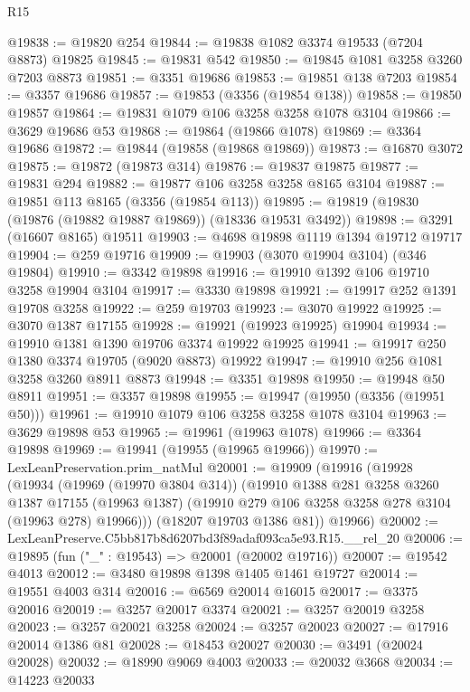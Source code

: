 \begin{lexlean}{R15}
\begin{coremodule}
@19838 := @19820 @254
@19844 := @19838 @1082 @3374 @19533 (@7204 @8873) @19825
@19845 := @19831 @542
@19850 := @19845 @1081 @3258 @3260 @7203 @8873
@19851 := @3351 @19686
@19853 := @19851 @138 @7203
@19854 := @3357 @19686
@19857 := @19853 (@3356 (@19854 @138))
@19858 := @19850 @19857
@19864 := @19831 @1079 @106 @3258 @3258 @1078 @3104
@19866 := @3629 @19686 @53
@19868 := @19864 (@19866 @1078)
@19869 := @3364 @19686
@19872 := @19844 (@19858 (@19868 @19869))
@19873 := @16870 @3072
@19875 := @19872 (@19873 @314)
@19876 := @19837 @19875
@19877 := @19831 @294
@19882 := @19877 @106 @3258 @3258 @8165 @3104
@19887 := @19851 @113 @8165 (@3356 (@19854 @113))
@19895 := @19819 (@19830 (@19876 (@19882 @19887 @19869)) (@18336 @19531 @3492))
@19898 := @3291 (@16607 @8165) @19511
@19903 := @4698 @19898 @1119 @1394 @19712 @19717
@19904 := @259 @19716
@19909 := @19903 (@3070 @19904 @3104) (@346 @19804)
@19910 := @3342 @19898
@19916 := @19910 @1392 @106 @19710 @3258 @19904 @3104
@19917 := @3330 @19898
@19921 := @19917 @252 @1391 @19708 @3258
@19922 := @259 @19703
@19923 := @3070 @19922
@19925 := @3070 @1387 @17155
@19928 := @19921 (@19923 @19925) @19904
@19934 := @19910 @1381 @1390 @19706 @3374 @19922 @19925
@19941 := @19917 @250 @1380 @3374 @19705 (@9020 @8873) @19922
@19947 := @19910 @256 @1081 @3258 @3260 @8911 @8873
@19948 := @3351 @19898
@19950 := @19948 @50 @8911
@19951 := @3357 @19898
@19955 := @19947 (@19950 (@3356 (@19951 @50)))
@19961 := @19910 @1079 @106 @3258 @3258 @1078 @3104
@19963 := @3629 @19898 @53
@19965 := @19961 (@19963 @1078)
@19966 := @3364 @19898
@19969 := @19941 (@19955 (@19965 @19966))
@19970 := LexLeanPreservation.prim_natMul
@20001 := @19909
    (@19916
      (@19928
        (@19934
          (@19969 (@19970 @3804 @314))
          (@19910
            @1388
            @281
            @3258
            @3260
            @1387
            @17155
            (@19963 @1387)
            (@19910 @279 @106 @3258 @3258 @278 @3104 (@19963 @278) @19966)))
        (@18207 @19703 @1386 @81))
      @19966)
@20002 := LexLeanPreserve.C5bb817b8d6207bd3f89adaf093ca5e93.R15.__rel_20
@20006 := @19895 (fun ("_" : @19543) => @20001 (@20002 @19716))
@20007 := @19542 @4013
@20012 := @3480 @19898 @1398 @1405 @1461 @19727
@20014 := @19551 @4003 @314
@20016 := @6569 @20014 @16015
@20017 := @3375 @20016
@20019 := @3257 @20017 @3374
@20021 := @3257 @20019 @3258
@20023 := @3257 @20021 @3258
@20024 := @3257 @20023
@20027 := @17916 @20014 @1386 @81
@20028 := @18453 @20027
@20030 := @3491 (@20024 @20028)
@20032 := @18990 @9069 @4003
@20033 := @20032 @3668
@20034 := @14223 @20033

\end{coremodule}
\end{lexlean}
